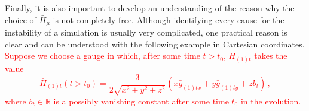 \documentclass[a4paper,11pt]{article}
\numberwithin{equation}{section}
\begin{document}
Finally, it is also important to develop an understanding of the reason why the choice of $\bar{H}_\mu$ is not completely free. 
Although identifying every cause for the instability of a simulation is usually very complicated, one practical reason is clear and can be understood with the following example in Cartesian coordinates.
\textcolor{red}{Suppose we choose a gauge in which, after some time $t>t_0$, $\bar{H}_{(1)t}$ takes the value
\begin{equation} 
\bar{H}_{(1)t}(t>t_0)=\frac{3}{2\sqrt{x^2+y^2+z^2}}(x \bar{g}_{(1)tx}+y\bar{g}_{(1)ty}+z b_t)\,,
\end{equation} 
where $b_t\in \mathbb{R}$ is a possibly vanishing constant after some time $t_0$ in the evolution. }
\end{document}
